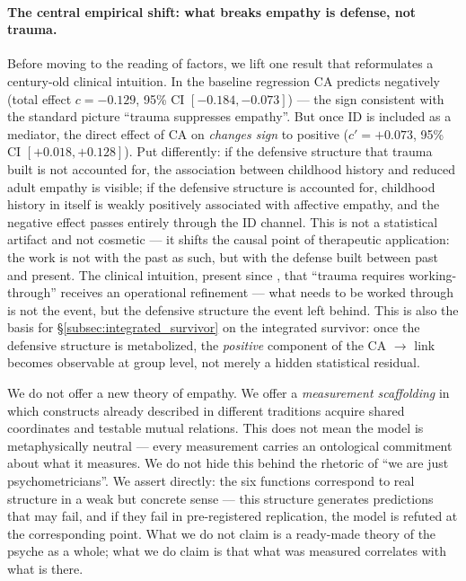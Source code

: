 \paragraph{The central empirical shift: what breaks empathy is defense, not trauma.} Before moving to the reading of factors, we lift one result that reformulates a century-old clinical intuition. In the baseline regression CA predicts \EAF{} negatively (total effect $c = -0.129$, 95\% CI $[-0.184, -0.073]$) --- the sign consistent with the standard picture ``trauma suppresses empathy''. But once ID is included as a mediator, the direct effect of CA on \EAF{} \emph{changes sign} to positive ($c' = +0.073$, 95\% CI $[+0.018, +0.128]$). Put differently: if the defensive structure that trauma built is not accounted for, the association between childhood history and reduced adult empathy is visible; if the defensive structure is accounted for, childhood history in itself is weakly positively associated with affective empathy, and the negative effect passes entirely through the ID channel. This is not a statistical artifact and not cosmetic --- it shifts the causal point of therapeutic application: the work is not with the past as such, but with the defense built between past and present. The clinical intuition, present since \citet{freud1917}, that ``trauma requires working-through'' receives an operational refinement --- what needs to be worked through is not the event, but the defensive structure the event left behind. This is also the basis for §\ref{subsec:integrated_survivor} on the integrated survivor: once the defensive structure is metabolized, the \emph{positive} component of the CA $\to$ \EAF{} link becomes observable at group level, not merely a hidden statistical residual.

We do not offer a new theory of empathy. We offer a \emph{measurement scaffolding} in which constructs already described in different traditions acquire shared coordinates and testable mutual relations. This does not mean the model is metaphysically neutral --- every measurement carries an ontological commitment about what it measures. We do not hide this behind the rhetoric of ``we are just psychometricians''. We assert directly: the six \DEIC{} functions correspond to real structure in a weak but concrete sense --- this structure generates predictions that may fail, and if they fail in pre-registered replication, the model is refuted at the corresponding point. What we do not claim is a ready-made theory of the psyche as a whole; what we do claim is that what was measured correlates with what is there.

